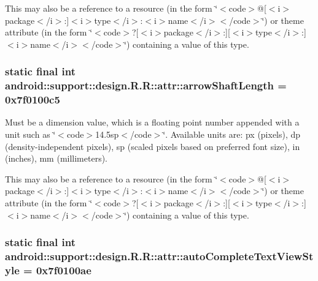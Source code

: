 This may also be a reference to a resource (in the form \char`\"{}$<$code$>$@\mbox{[}$<$i$>$package$<$/i$>$:\mbox{]}$<$i$>$type$<$/i$>$:$<$i$>$name$<$/i$>$$<$/code$>$\char`\"{}) or theme attribute (in the form \char`\"{}$<$code$>$?\mbox{[}$<$i$>$package$<$/i$>$:\mbox{]}\mbox{[}$<$i$>$type$<$/i$>$:\mbox{]}$<$i$>$name$<$/i$>$$<$/code$>$\char`\"{}) containing a value of this type. \hypertarget{classandroid_1_1support_1_1design_1_1_r_1_1attr_8dfdb54435d38bd8bf67a457862aefaa}{
\subsubsection[{arrowShaftLength}]{\setlength{\rightskip}{0pt plus 5cm}static final int android::support::design.R.R::attr::arrowShaftLength = 0x7f0100c5}}
\label{classandroid_1_1support_1_1design_1_1_r_1_1attr_8dfdb54435d38bd8bf67a457862aefaa}


Must be a dimension value, which is a floating point number appended with a unit such as \char`\"{}$<$code$>$14.5sp$<$/code$>$\char`\"{}. Available units are: px (pixels), dp (density-independent pixels), sp (scaled pixels based on preferred font size), in (inches), mm (millimeters). 

This may also be a reference to a resource (in the form \char`\"{}$<$code$>$@\mbox{[}$<$i$>$package$<$/i$>$:\mbox{]}$<$i$>$type$<$/i$>$:$<$i$>$name$<$/i$>$$<$/code$>$\char`\"{}) or theme attribute (in the form \char`\"{}$<$code$>$?\mbox{[}$<$i$>$package$<$/i$>$:\mbox{]}\mbox{[}$<$i$>$type$<$/i$>$:\mbox{]}$<$i$>$name$<$/i$>$$<$/code$>$\char`\"{}) containing a value of this type. \hypertarget{classandroid_1_1support_1_1design_1_1_r_1_1attr_14cedd915d8c4f0ac483e1cfbca0720a}{
\subsubsection[{autoCompleteTextViewStyle}]{\setlength{\rightskip}{0pt plus 5cm}static final int android::support::design.R.R::attr::autoCompleteTextViewStyle = 0x7f0100ae}}
\label{classandroid_1_1support_1_1design_1_1_r_1_1attr_14cedd915d8c4f0ac483e1cfbca0720a}


